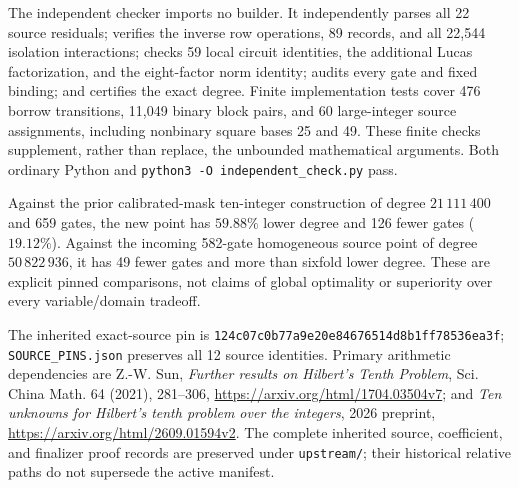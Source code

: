 The independent checker imports no builder. It independently parses all
22 source residuals; verifies the inverse row operations, 89 records,
and all 22,544 isolation interactions; checks 59 local circuit identities,
the additional Lucas factorization, and the eight-factor norm identity;
audits every gate and fixed binding; and certifies the exact degree.
Finite implementation tests cover 476 borrow transitions, 11,049 binary
block pairs, and 60 large-integer source assignments, including nonbinary
square bases 25 and 49. These finite checks supplement, rather than replace,
the unbounded mathematical arguments. Both ordinary Python and
\texttt{python3 -O independent\_check.py} pass.

Against the prior calibrated-mask ten-integer construction of degree
$21\,111\,400$ and 659 gates, the new point has $59.88\%$ lower degree and
126 fewer gates ($19.12\%$). Against the incoming 582-gate homogeneous
source point of degree $50\,822\,936$, it has 49 fewer gates and more than
sixfold lower degree. These are explicit pinned comparisons, not claims
of global optimality or superiority over every variable/domain tradeoff.

The inherited exact-source pin is
\texttt{124c07c0b77a9e20e84676514d8b1ff78536ea3f};
\texttt{SOURCE\_PINS.json} preserves all 12 source identities.
Primary arithmetic dependencies are Z.-W. Sun,
\emph{Further results on Hilbert's Tenth Problem}, Sci. China Math. 64
(2021), 281--306, \url{https://arxiv.org/html/1704.03504v7}; and
\emph{Ten unknowns for Hilbert's tenth problem over the integers},
2026 preprint, \url{https://arxiv.org/html/2609.01594v2}.
The complete inherited source, coefficient, and finalizer proof records
are preserved under \texttt{upstream/}; their historical relative paths
do not supersede the active manifest.
